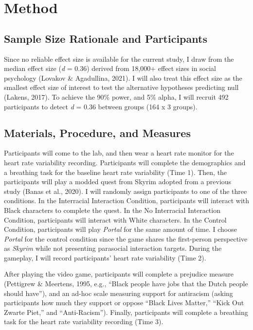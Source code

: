 \documentclass[
  english,
  man, noextraspace,floatsintext]{apa6}
\begin{document}
\hypertarget{method}{%
\section{Method}\label{method}}

\hypertarget{sample-size-rationale-and-participants}{%
\subsection{Sample Size Rationale and Participants}\label{sample-size-rationale-and-participants}}

Since no reliable effect size is available for the current study, I draw from the median effect size (\emph{d} = 0.36) derived from 18,000+ effect sizes in social psychology (Lovakov \& Agadullina, 2021). I will also treat this effect size as the smallest effect size of interest to test the alternative hypotheses predicting null (Lakens, 2017). To achieve the 90\% power, and 5\% alpha, I will recruit 492 participants to detect \emph{d} = 0.36 between groups (164 x 3 groups).

\hypertarget{materials-procedure-and-measures}{%
\subsection{Materials, Procedure, and Measures}\label{materials-procedure-and-measures}}

Participants will come to the lab, and then wear a heart rate monitor for the heart rate variability recording. Participants will complete the demographics and a breathing task for the baseline heart rate variability (Time 1). Then, the participants will play a modded quest from Skyrim adopted from a previous study (Banas et al., 2020). I will randomly assign participants to one of the three conditions. In the Interracial Interaction Condition, participants will interact with Black characters to complete the quest. In the No Interracial Interaction Condition, participants will interact with White characters. In the Control Condition, participants will play \emph{Portal} for the same amount of time. I choose \emph{Portal} for the control condition since the game shares the first-person perspective as \emph{Skyrim} while not presenting parasocial interaction targets. During the gameplay, I will record participants' heart rate variability (Time 2).

After playing the video game, participants will complete a prejudice measure (Pettigrew \& Meertens, 1995, e.g., {``Black people have jobs that the Dutch people should have''}), and an ad-hoc scale measuring support for antiracism (asking participants how much they support or oppose ``Black Lives Matter,'' ``Kick Out Zwarte Piet,'' and ``Anti-Racism''). Finally, participants will complete a breathing task for the heart rate variability recording (Time 3).
\end{document}
